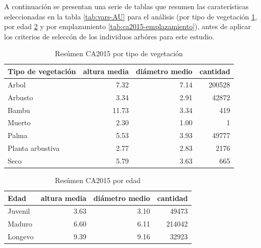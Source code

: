 \documentclass[12pt,]{book}
\begin{document}
A continuación se presentan una serie de tablas que resumen las
caraterísticas seleccionadas en la tabla \ref{tab:vars-AU} para el
análisis (por tipo de vegetación \ref{tab:ca2015-vegetacion}, por edad
\ref{tab:ca2015-edad} y por emplazamiento
\ref{tab:ca2015-emplazamiento}), antes de aplicar los criterios de
seleccón de los individuos arbóres para este estudio.

\begin{table}

\caption{\label{tab:ca2015-vegetacion}Resúmen CA2015 por tipo de vegetación}
\centering
\begin{tabular}[t]{l|r|r|r}
\hline
Tipo de vegetación & altura media & diámetro medio & cantidad\\
\hline
Arbol & 7.32 & 7.14 & 200528\\
\hline
Arbusto & 3.34 & 2.91 & 42872\\
\hline
Bambu & 11.73 & 3.34 & 419\\
\hline
Muerto & 2.30 & 1.00 & 1\\
\hline
Palma & 5.53 & 3.93 & 49777\\
\hline
Planta arbustiva & 2.77 & 2.83 & 2176\\
\hline
Seco & 5.79 & 3.63 & 665\\
\hline
\end{tabular}
\end{table}

\begin{table}

\caption{\label{tab:ca2015-edad}Resúmen CA2015 por edad}
\centering
\begin{tabular}[t]{l|r|r|r}
\hline
Edad & altura media & diámetro medio & cantidad\\
\hline
Juvenil & 3.63 & 3.10 & 49473\\
\hline
Maduro & 6.60 & 6.11 & 214042\\
\hline
Longevo & 9.39 & 9.16 & 32923\\
\hline
\end{tabular}
\end{table}
\end{document}
